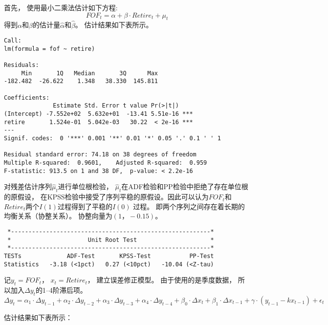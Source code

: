 首先， 使用最小二乘法估计如下方程:
$$FOF_t = \alpha + \beta \cdot Retire_t + \mu_t$$
得到$\alpha$和$\beta$的估计量$\hat{\alpha}$和$\hat{\beta}$。 估计结果如下表所示。

\begin{framed}
\begin{verbatim} 
Call:
lm(formula = fof ~ retire)

Residuals:
     Min       1Q   Median       3Q      Max 
-182.482  -26.622    1.348   38.330  145.811 

Coefficients:
              Estimate Std. Error t value Pr(>|t|)    
(Intercept) -7.552e+02  5.632e+01  -13.41 5.51e-16 ***
retire       1.524e-01  5.042e-03   30.22  < 2e-16 ***
---
Signif. codes:  0 '***' 0.001 '**' 0.01 '*' 0.05 '.' 0.1 ' ' 1

Residual standard error: 74.18 on 38 degrees of freedom
Multiple R-squared:  0.9601,    Adjusted R-squared:  0.959 
F-statistic: 913.5 on 1 and 38 DF,  p-value: < 2.2e-16
\end{verbatim}
\end{framed}



对残差估计序列${\hat{\mu}_t}$进行单位根检验， ${\hat{\mu}_t}$在ADF检验和PP检验中拒绝了存在单位根的原假设， 在KPSS检验中接受了序列平稳的原假设。因此可以认为${FOF_t}$和${Retire_t}$两个$I(1)$过程得到了平稳的$I(0)$
过程。 即两个序列之间存在着长期的均衡关系（协整关系）。 协整向量为$(1， -0.15)$。

\begin{framed}
\begin{verbatim}
 *---------------------------------------------------------*
 *                      Unit Root Test                     *
 *---------------------------------------------------------*    
TESTs             ADF-Test       KPSS-Test           PP-Test
Statistics   -3.18 (<1pct)   0.27 (<10pct)   -10.04 (<Z-tau)
\end{verbatim}
\end{framed}

记$y_t = FOF_t$， $x_t = Retire_t$， 建立误差修正模型。 由于使用的是季度数据， 所以加入$\Delta y_t$的1--4阶滞后项。
$$
\Delta y_t = \alpha_1 \cdot \Delta y_{t-1} + \alpha_2  \cdot \Delta  y_{t-2} + \alpha_3 \cdot \Delta  y_{t-3} + \alpha_4 \cdot \Delta  y_{t-4} + \beta_0 \cdot \Delta  x_t+\beta_1 \cdot \Delta  x_{t-1} + \gamma \cdot ( y_{t-1}-kx_{t-1}) + \epsilon_t
$$


估计结果如下表所示：

